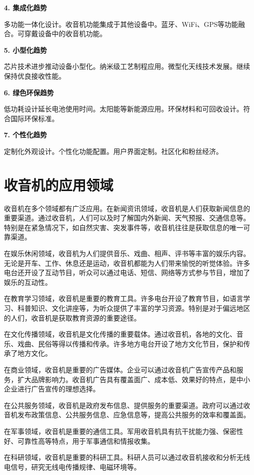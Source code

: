 \documentclass[12pt,UTF8]{ctexbook}
\begin{document}
\textbf{4. 集成化趋势}

多功能一体化设计。收音机功能集成于其他设备中。蓝牙、WiFi、GPS等功能融合。可穿戴设备中的收音机功能。

\textbf{5. 小型化趋势}

芯片技术进步推动设备小型化。纳米级工艺制程应用。微型化天线技术发展。继续保持优良接收性能。

\textbf{6. 绿色环保趋势}

低功耗设计延长电池使用时间。太阳能等新能源应用。环保材料和可回收设计。符合国际环保标准。

\textbf{7. 个性化趋势}

定制化外观设计。个性化功能配置。用户界面定制。社区化和粉丝经济。

\section{收音机的应用领域}

收音机在多个领域都有广泛应用。在新闻资讯领域，收音机是人们获取新闻信息的重要渠道。通过收音机，人们可以及时了解国内外新闻、天气预报、交通信息等。特别是在紧急情况下，如自然灾害、突发事件等，收音机往往是获取信息的唯一可靠渠道。

在娱乐休闲领域，收音机为人们提供音乐、戏曲、相声、评书等丰富的娱乐内容。无论是开车、工作、休息还是运动，收音机都能为人们带来愉悦的听觉体验。许多电台还开设了互动节目，听众可以通过电话、短信、网络等方式参与节目，增加了娱乐的互动性。

在教育学习领域，收音机是重要的教育工具。许多电台开设了教育节目，如语言学习、科普知识、文化讲座等，为听众提供了丰富的学习资源。特别是对于偏远地区的人们，收音机是获取教育资源的重要途径。

在文化传播领域，收音机是文化传播的重要载体。通过收音机，各地的文化、音乐、戏曲、民俗等得以传播和传承。许多地方电台开设了地方文化节目，保护和传承了地方文化。

在商业领域，收音机是重要的广告媒体。企业可以通过收音机广告宣传产品和服务，扩大品牌影响力。收音机广告具有覆盖面广、成本低、效果好的特点，是中小企业进行广告宣传的理想选择。

在公共服务领域，收音机是政府发布信息、提供服务的重要渠道。政府可以通过收音机发布政策信息、公共服务信息、应急信息等，提高公共服务的效率和覆盖面。

在军事领域，收音机是重要的通信工具。军用收音机具有抗干扰能力强、保密性好、可靠性高等特点，用于军事通信和情报收集。

在科研领域，收音机是重要的科研工具。科研人员可以通过收音机接收和分析无线电信号，研究无线电传播规律、电磁环境等。
\end{document}
